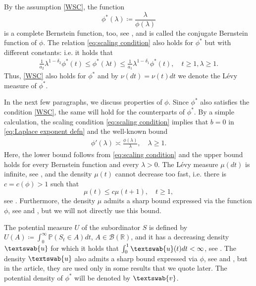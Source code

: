 \documentclass[12pt,a4paper,onecolumn]{amsart}
\theoremstyle{definition}
\newcommand{\R}{\mathbb{R}}
\newcommand{\p}{\mathbb{P}}
\newcommand{\1}{\mathbf 1}
\newcommand{\BB}{\mathcal{B}}
\newcommand{\uu}{\textswab{u}}
\newcommand{\vv}{\textswab{v}}
\numberwithin{equation}{section}
\begin{document}
By the assumption \ref{WSC}, the function 
\begin{equation}\label{eq:phi_conjugate}
\phi^*(\lambda)\coloneqq \frac{\lambda}{\phi(\lambda)}
\end{equation}
is a complete Bernstein function, too, see \cite[Proposition 7.1]{bernstein}, and is called the conjugate Bernstein function of $\phi$. The relation \eqref{eq:scaling condition} also holds for $\phi^*$ but with different constants: i.e. it holds that
\begin{align}\label{eq:scaling condition phi*}
    {\frac1{a_2}} \lambda^{1-\delta_2}\phi^*(t)\le \phi^*(\lambda t)\le {\frac1{a_1}}\lambda^{1-\delta_1}\phi^*(t),\quad t\ge1, \lambda\ge 1.
\end{align}
Thus, \ref{WSC} also holds for $\phi^*$ and by $\nu(dt)=\nu(t)dt$ we denote the L\'evy measure of $\phi^*$.

In the next few paragraphs, we discuss properties of $\phi$. Since $\phi^*$ also satisfies the condition \ref{WSC}, the same will hold for the counterparts of $\phi^*$.
By a simple calculation, the scaling condition \eqref{eq:scaling condition} implies that $b=0$ in \eqref{eq:Laplace exponent defn} and the well-known bound
\begin{align}\label{eq:scaling and the derivative}
	\phi'(\lambda)\asymp \frac{\phi(\lambda)}{\lambda}, \quad\lambda\ge1.
\end{align}
Here, the lower bound follows from \eqref{eq:scaling condition} and the upper bound holds for every Bernstein function and every $\lambda>0$. The L\'evy measure $\mu(dt)$ is infinite, see \cite[p. 160]{bernstein}, and the density $\mu(t)$ cannot decrease too fast, i.e. there is $c=c(\phi)>1$ such that
$$ \mu(t)\le c\mu(t+1), \quad t\ge 1,$$
see \cite[Lemma 2.1]{ksv_twosided}. Furthermore, the density $\mu$ admits a sharp bound expressed via the function $\phi$, see \cite[Eq. (2.13)]{ksv_minimal2016} and \cite[Proposition 3.3]{mimica}, but we will not directly use this bound.

The potential measure $U$ of the subordinator $S$ is defined by $U(A)\coloneqq \int_0^\infty \p(S_t\in A)dt$, $A\in \BB(\R)$, and it has a decreasing density $\uu$ for which it holds that $\int_0^1 \uu(t)dt<\infty$, see \cite[Theorem 11.3]{bernstein}. The density $\uu$ also admits a sharp bound expressed via $\phi$, see \cite[Eq. (2.11)]{ksv_minimal2016} and \cite[Proposition 3.4]{mimica}, but in the article, they are used only in some results that we quote later. The potential density of $\phi^*$ will be denoted by $\vv$.
\end{document}
